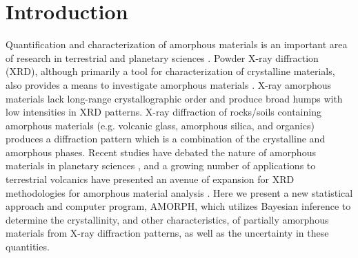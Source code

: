 \documentclass[review]{elsarticle}
\begin{document}
\section{Introduction}
Quantification and characterization of amorphous materials is an important area of research in
terrestrial and planetary sciences \citep[e.g.,][]{schmidt2009, dehouck2014, wall2014, morris2016, zorn2018}.
Powder X-ray diffraction (XRD), although primarily a tool for characterization of crystalline materials,
also provides a means to investigate amorphous materials \citep[e.g.,][]{rowe2012, achilles2013}. X-ray amorphous materials lack long-range crystallographic order and produce broad humps with low intensities in XRD patterns. X-ray diffraction of rocks/soils containing amorphous materials (e.g. volcanic
glass, amorphous silica, and organics) produces a diffraction pattern which is a combination of the
crystalline and amorphous phases. Recent studies have debated the nature of amorphous materials in
planetary sciences \citep[e.g.][]{schmidt2009, dehouck2014}, and a growing number of
applications to terrestrial volcanics have presented an avenue of expansion for XRD methodologies
for amorphous material analysis \citep{ellis2015, kanakiya2017, zorn2018}.
Here we present a new statistical approach and computer program, AMORPH, which utilizes Bayesian inference to determine
the crystallinity, and other characteristics, of partially amorphous materials from X-ray diffraction patterns, as well as the uncertainty in these quantities.
\end{document}
